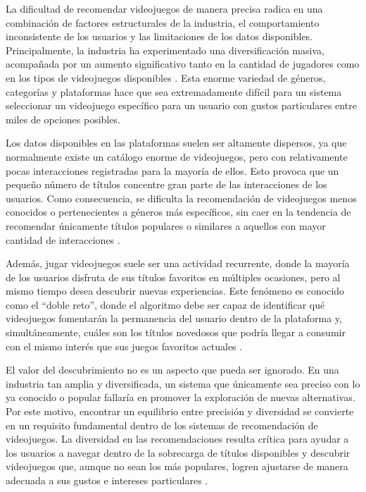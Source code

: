 La dificultad de recomendar videojuegos de manera precisa radica en una combinación de factores estructurales de la industria, el comportamiento inconsistente de los usuarios y las limitaciones de los datos disponibles. Principalmente, la industria ha experimentado una diversificación masiva, acompañada por un aumento significativo tanto en la cantidad de jugadores como en los tipos de videojuegos disponibles \parencite{CheuqueEtAl2019, LeeJung2019}. Esta enorme variedad de géneros, categorías y plataformas hace que sea extremadamente difícil para un sistema seleccionar un videojuego específico para un usuario con gustos particulares entre miles de opciones posibles.

Los datos disponibles en las plataformas suelen ser altamente dispersos, ya que normalmente existe un catálogo enorme de videojuegos, pero con relativamente pocas interacciones registradas para la mayoría de ellos. Esto provoca que un pequeño número de títulos concentre gran parte de las interacciones de los usuarios. Como consecuencia, se dificulta la recomendación de videojuegos menos conocidos o pertenecientes a géneros más específicos, sin caer en la tendencia de recomendar únicamente títulos populares o similares a aquellos con mayor cantidad de interacciones \parencite{CheuqueEtAl2019, ViljanenEtAl2020}.

Además, jugar videojuegos suele ser una actividad recurrente, donde la mayoría de los usuarios disfruta de sus títulos favoritos en múltiples ocasiones, pero al mismo tiempo desea descubrir nuevas experiencias. Este fenómeno es conocido como el \enquote{doble reto}, donde el algoritmo debe ser capaz de identificar qué videojuegos fomentarán la permanencia del usuario dentro de la plataforma y, simultáneamente, cuáles son los títulos novedosos que podría llegar a consumir con el mismo interés que sus juegos favoritos actuales \parencite{CheuqueEtAl2019}.

El valor del descubrimiento no es un aspecto que pueda ser ignorado. En una industria tan amplia y diversificada, un sistema que únicamente sea preciso con lo ya conocido o popular fallaría en promover la exploración de nuevas alternativas. Por este motivo, encontrar un equilibrio entre precisión y diversidad se convierte en un requisito fundamental dentro de los sistemas de recomendación de videojuegos. La diversidad en las recomendaciones resulta crítica para ayudar a los usuarios a navegar dentro de la sobrecarga de títulos disponibles y descubrir videojuegos que, aunque no sean los más populares, logren ajustarse de manera adecuada a sus gustos e intereses particulares \parencite{CheuqueEtAl2019}.

